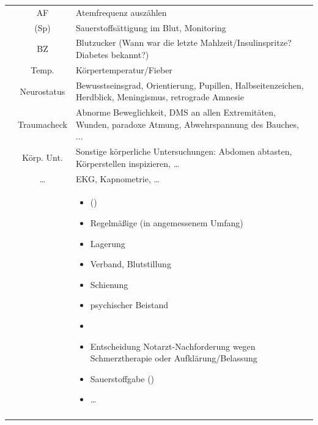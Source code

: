 {\begin{minipage}{\linewidth}
{\begin{tabulary}{\linewidth}[H]{lCL}
{}
 &
{\sffamily AF}
 &
Atemfrequenz auszählen
\\\addlinespace
 &
({\sffamily Sp})
 &
Sauerstoffsättigung im Blut, Monitoring
\\\addlinespace
 &
{\sffamily  BZ}
 &
Blutzucker {\tiny(Wann war die letzte
Mahlzeit/Insulinspritze? Diabetes bekannt?)}
\\\addlinespace
 &
{\sffamily Temp.}
 &
Körpertemperatur/Fieber
\\\addlinespace
 &
 {\sffamily\small Neuro\-status}
 &
Bewusstseinsgrad, Orientierung,
Pupillen, Halbseitenzeichen, Herdblick, Meningismus,
retrograde Amnesie
\\\addlinespace
 &
{\sffamily\small Trauma\-check}
 &
Abnorme Beweglichkeit, DMS an allen
Extremitäten, Wunden, paradoxe Atmung,
Abwehrspannung des Bauches, ...
\\\addlinespace
 &
{\sffamily\small Körp. Unt.}
&
Sonstige körperliche Untersuchungen: Abdomen abtasten,
Körperstellen inspizieren, \ldots
\\\addlinespace
 &
{\sffamily\small \ldots}
&
EKG, Kapnometrie, \ldots
\\\addlinespace\midrule\addlinespace
{}
&
&
\begin{minipage}{\linewidth}
\begin{itemize}
  \item {}
  ()
  \item Regelmäßige  {\tiny(in angemessenem Umfang)}
  \item Lagerung
  \item Verband, Blutstillung
  \item Schienung
  \item psychischer Beistand
  \item {}
  \item Entscheidung Notarzt-Nachforderung wegen
  Schmerztherapie oder Aufklärung/Belassung
  \item Sauerstoffgabe ()
  \item \ldots
\end{itemize}
\end{minipage}
\\\addlinespace\midrule\addlinespace
{}
&
&
\begin{minipage}{\linewidth}
\begin{itemize}

\end{itemize}
\end{minipage}
\end{tabulary}}
\end{minipage}}
